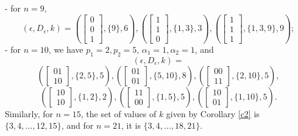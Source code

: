 \documentclass{amsart}
\newtheorem{cor}[thm]{Corollary}
\numberwithin{equation}{section}
\theoremstyle{definition}
\begin{document}
- for $n=9$, $$(\epsilon,D_\epsilon,k)=\left(\left[\begin{array}{l}0\\0\\1\end{array}\right],\{9\},6\right),\left(\left[\begin{array}{l}1\\1\\0\end{array}\right],\{1,3\},3\right),\left(\left[\begin{array}{l}1\\1\\1\end{array}\right],\{1,3,9\},9\right);$$
- for $n=10$, we have $p_1=2, p_2=5$, $\alpha_1=1, \alpha_2=1$, and
$$(\epsilon,D_\epsilon,k)=$$$$\left(\left[\begin{array}{l}01\\10\end{array}\right],\{2,5\},5\right),\left(\left[\begin{array}{l}01\\01\end{array}\right],\{5,10\},8\right),\left(\left[\begin{array}{l}00\\11\end{array}\right],\{2,10\},5\right),$$$$\left(\left[\begin{array}{l}10\\10\end{array}\right],\{1,2\},2\right),\left(\left[\begin{array}{l}11\\00\end{array}\right],\{1,5\},5\right),\left(\left[\begin{array}{l}10\\01\end{array}\right],\{1,10\},5\right).$$ 
Similarly, for $n=15$, the set of values of $k$ given by Corollary \ref{c2} is $\{3,4,\dots,12,15\}$, and for $n=21$, it is $\{3,4,\dots,18,21\}$. %


\end{document}
